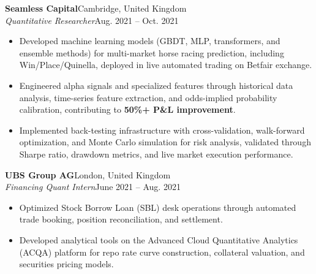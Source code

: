 \documentclass[10pt,a4paper]{article}
\newcommand{\experience}[4]{%
    \textbf{#1}\hfill #2\\
    \textit{#3}\hfill #4%
}
\begin{document}
\experience{Seamless Capital}{Cambridge, United Kingdom}
{Quantitative Researcher}{Aug. 2021 -- Oct. 2021}
\begin{itemize}
    \item Developed machine learning models (GBDT, MLP, transformers, and ensemble methods) for multi-market horse racing prediction, including Win/Place/Quinella, deployed in live automated trading on Betfair exchange.
    \item Engineered alpha signals and specialized features through historical data analysis, time-series feature extraction, and odds-implied probability calibration, contributing to \textbf{50\%+ P\&L improvement}.
    \item Implemented back-testing infrastructure with cross-validation, walk-forward optimization, and Monte Carlo simulation for risk analysis, validated through Sharpe ratio, drawdown metrics, and live market execution performance.
\end{itemize}

\experience{UBS Group AG}{London, United Kingdom}
{Financing Quant Intern}{June 2021 -- Aug. 2021}
\begin{itemize}
    \item Optimized Stock Borrow Loan (SBL) desk operations through automated trade booking, position reconciliation, and settlement.
    \item Developed analytical tools on the Advanced Cloud Quantitative Analytics (ACQA) platform for repo rate curve construction, collateral valuation, and securities pricing models.
\end{itemize}

\end{document}
